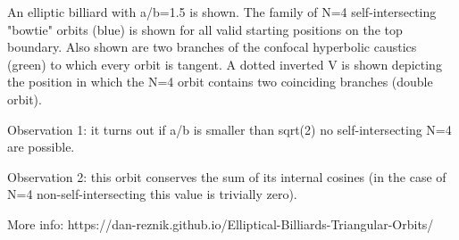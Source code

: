 An elliptic billiard with a/b=1.5 is shown. The family of N=4 self-intersecting "bowtie" orbits (blue) is shown for all valid starting positions on the top boundary. Also shown are two branches of the confocal hyperbolic caustics (green) to which every orbit is tangent. A dotted inverted V is shown depicting the position in which the N=4 orbit contains two coinciding branches (double orbit).

Observation 1: it turns out if a/b is smaller than sqrt(2) no self-intersecting N=4 are possible. 

Observation 2: this orbit conserves the sum of its internal cosines (in the case of N=4 non-self-intersecting this value is trivially zero).

More info: https://dan-reznik.github.io/Elliptical-Billiards-Triangular-Orbits/